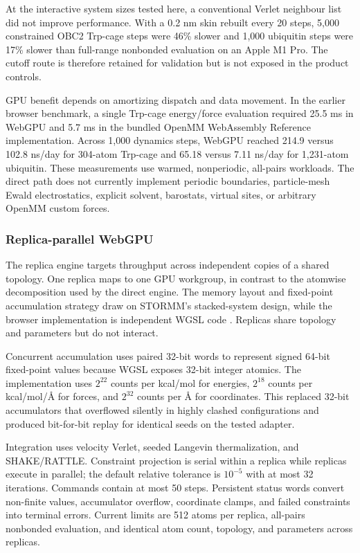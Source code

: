 \documentclass[11pt]{article}
\begin{document}
\begin{small}
At the interactive system sizes tested here, a conventional Verlet neighbour list did not improve performance. With a 0.2 nm skin rebuilt every 20 steps, 5,000 constrained OBC2 Trp-cage steps were 46\% slower and 1,000 ubiquitin steps were 17\% slower than full-range nonbonded evaluation on an Apple M1 Pro. The cutoff route is therefore retained for validation but is not exposed in the product controls.

GPU benefit depends on amortizing dispatch and data movement. In the earlier browser benchmark, a single Trp-cage energy/force evaluation required 25.5 ms in WebGPU and 5.7 ms in the bundled OpenMM WebAssembly Reference implementation. Across 1,000 dynamics steps, WebGPU reached 214.9 versus 102.8 ns/day for 304-atom Trp-cage and 65.18 versus 7.11 ns/day for 1,231-atom ubiquitin. These measurements use warmed, nonperiodic, all-pairs workloads. The direct path does not currently implement periodic boundaries, particle-mesh Ewald electrostatics, explicit solvent, barostats, virtual sites, or arbitrary OpenMM custom forces.

\subsubsection{Replica-parallel WebGPU}

The replica engine targets throughput across independent copies of a shared topology. One replica maps to one GPU workgroup, in contrast to the atomwise decomposition used by the direct engine. The memory layout and fixed-point accumulation strategy draw on STORMM's stacked-system design, while the browser implementation is independent WGSL code \citep{cerutti2024stormm}. Replicas share topology and parameters but do not interact.

Concurrent accumulation uses paired 32-bit words to represent signed 64-bit fixed-point values because WGSL exposes 32-bit integer atomics. The implementation uses $2^{22}$ counts per kcal/mol for energies, $2^{18}$ counts per kcal/mol/\AA{} for forces, and $2^{32}$ counts per \AA{} for coordinates. This replaced 32-bit accumulators that overflowed silently in highly clashed configurations and produced bit-for-bit replay for identical seeds on the tested adapter.

Integration uses velocity Verlet, seeded Langevin thermalization, and SHAKE/RATTLE. Constraint projection is serial within a replica while replicas execute in parallel; the default relative tolerance is $10^{-5}$ with at most 32 iterations. Commands contain at most 50 steps. Persistent status words convert non-finite values, accumulator overflow, coordinate clamps, and failed constraints into terminal errors. Current limits are 512 atoms per replica, all-pairs nonbonded evaluation, and identical atom count, topology, and parameters across replicas.


\end{small}
\end{document}
